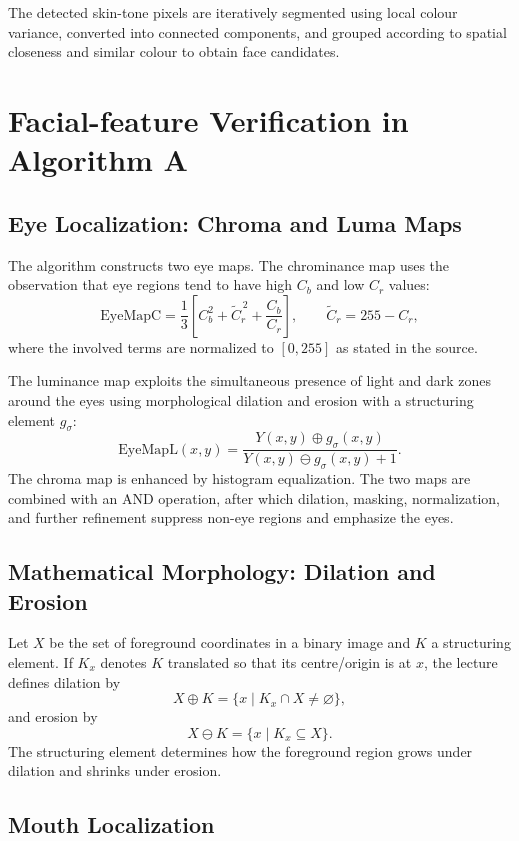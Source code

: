 \documentclass[11pt,a4paper,oneside]{report}
\begin{document}
The detected skin-tone pixels are iteratively segmented using local colour
variance, converted into connected components, and grouped according to spatial
closeness and similar colour to obtain face candidates.

\section{Facial-feature Verification in Algorithm A}

\subsection{Eye Localization: Chroma and Luma Maps}

The algorithm constructs two eye maps.  The chrominance map uses the observation
that eye regions tend to have high $C_b$ and low $C_r$ values:
\[
\mathrm{EyeMapC}=\frac{1}{3}\left[
C_b^2+\widetilde{C}_r^{\,2}+\frac{C_b}{C_r}
\right],
\qquad
\widetilde{C}_r=255-C_r,
\]
where the involved terms are normalized to $[0,255]$ as stated in the source.

The luminance map exploits the simultaneous presence of light and dark zones
around the eyes using morphological dilation and erosion with a structuring
element $g_{\sigma}$:
\[
\mathrm{EyeMapL}(x,y)=
\frac{Y(x,y)\oplus g_{\sigma}(x,y)}
     {Y(x,y)\ominus g_{\sigma}(x,y)+1}.
\]
The chroma map is enhanced by histogram equalization.  The two maps are combined
with an AND operation, after which dilation, masking, normalization, and further
refinement suppress non-eye regions and emphasize the eyes.

\subsection{Mathematical Morphology: Dilation and Erosion}

Let $X$ be the set of foreground coordinates in a binary image and $K$ a
structuring element.  If $K_x$ denotes $K$ translated so that its centre/origin
is at $x$, the lecture defines dilation by
\[
    X\oplus K=\{x\mid K_x\cap X\neq\varnothing\},
\]
and erosion by
\[
    X\ominus K=\{x\mid K_x\subseteq X\}.
\]
The structuring element determines how the foreground region grows under
dilation and shrinks under erosion.

\subsection{Mouth Localization}
\end{document}
